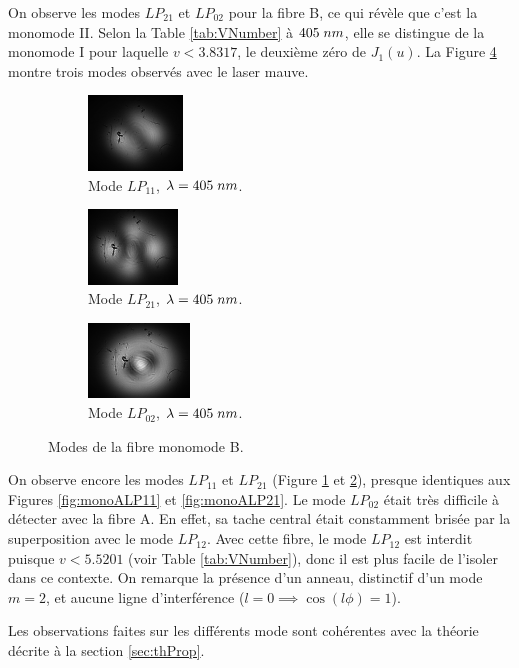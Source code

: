 \documentclass[10pt,letterpaper,twocolumn]{article}
\newcommand{\s}{\hspace{0.1cm}}
\begin{document}
On observe les modes $LP_{21}$ et $LP_{02}$ pour la fibre B, ce qui révèle que c'est la monomode II. Selon la Table \ref{tab:VNumber} à $405\s nm$, elle se distingue de la monomode I pour laquelle $v< 3.8317$, le deuxième zéro de $J_1(u)$. La Figure \ref{fig:MONOB} montre trois modes observés avec le laser mauve. 
\begin{figure}[H]
	\centering
	\begin{subfigure}{0.3\linewidth}
		\includegraphics[height=2cm, width=\linewidth]{figures/monoB-BLUE-LP11(VRAI).jpg}
		\caption{Mode $LP_{11}$, ${\lambda=405\s nm}$.}
		\label{fig:monaBLP11}
	\end{subfigure}
	\begin{subfigure}{0.3\linewidth}
		\includegraphics[height=2cm, width=\linewidth]{figures/monoB-BLUE-LP21.jpg}
		\caption{Mode $LP_{21}$, ${\lambda=405\s nm}$.}
		\label{fig:monaBLP21}
	\end{subfigure}
	\begin{subfigure}{0.3\linewidth}
		\includegraphics[height=2cm, width=\linewidth]{figures/monoB-BLUE-LP02.jpg}
		\caption{Mode $LP_{02}$, ${\lambda=405\s nm}$.}
		\label{fig:monaBLP02}
	\end{subfigure}
	\caption{Modes de la fibre monomode B.}
	\label{fig:MONOB}
\end{figure}
On observe encore les modes $LP_{11}$ et $LP_{21}$ (Figure  \ref{fig:monaBLP11} et \ref{fig:monaBLP21}), presque identiques aux Figures \ref{fig:monoALP11} et \ref{fig:monoALP21}. Le mode $LP_{02}$ était très difficile à détecter avec la fibre A. En effet, sa tache central était constamment brisée par la superposition avec le mode $LP_{12}$. Avec cette fibre, le mode $LP_{12}$ est interdit puisque $v<5.5201$ (voir Table \ref{tab:VNumber}), donc il est plus facile de l'isoler dans ce contexte. On remarque la présence d'un anneau, distinctif d'un mode $m=2$, et aucune ligne d'interférence (${l=0\implies \cos(l\phi) = 1}$).\par
Les observations faites sur les différents mode sont cohérentes avec la théorie décrite à la section \ref{sec:thProp}. 
\end{document}
